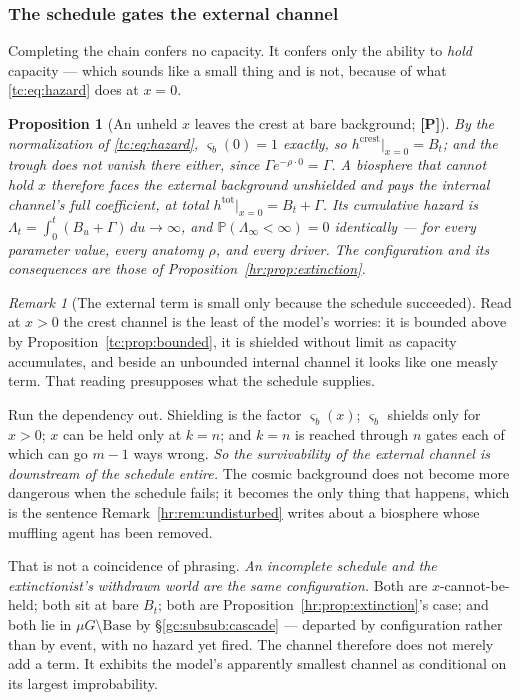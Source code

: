 \documentclass[11pt]{article}
\numberwithin{equation}{section}
\theoremstyle{plain}
\newtheorem{proposition}[theorem]{Proposition}
\theoremstyle{definition}
\theoremstyle{remark}
\newtheorem{remark}[theorem]{Remark}
\newcommand{\PP}{\mathbb{P}}
\begin{document}
\subsubsection{The schedule gates the external channel}
\label{sch:subsub:gating}

Completing the chain confers no capacity. It confers only the ability to
\emph{hold} capacity --- which sounds like a small thing and is not,
because of what \eqref{tc:eq:hazard} does at $x=0$.

\begin{proposition}[An unheld $x$ leaves the crest at bare background;
\textbf{[P]}]\label{sch:prop:gating}
By the normalization of \eqref{tc:eq:hazard}, $\varsigma_b(0)=1$
exactly, so $h^{\mathrm{crest}}\big|_{x=0}=B_t$; and the trough does not
vanish there either, since $\Gamma e^{-\rho\cdot0}=\Gamma$. A biosphere
that cannot hold $x$ therefore faces the external background unshielded
\emph{and} pays the internal channel's full coefficient, at total
$h^{\mathrm{tot}}\big|_{x=0}=B_t+\Gamma$. Its cumulative hazard is
$\Lambda_t=\int_0^t(B_u+\Gamma)\,du\to\infty$, and
$\PP(\Lambda_\infty<\infty)=0$ identically --- for every parameter
value, every anatomy $\rho$, and every driver. The configuration and its
consequences are those of Proposition~\ref{hr:prop:extinction}.
\end{proposition}

\begin{remark}[The external term is small only because the schedule
succeeded]\label{sch:rem:reliance}
Read at $x>0$ the crest channel is the least of the model's worries: it
is bounded above by Proposition~\ref{tc:prop:bounded}, it is shielded
without limit as capacity accumulates, and beside an unbounded internal
channel it looks like one measly term. That reading presupposes what the
schedule supplies.

Run the dependency out. Shielding is the factor $\varsigma_b(x)$;
$\varsigma_b$ shields only for $x>0$; $x$ can be held only at $k=n$; and
$k=n$ is reached through $n$ gates each of which can go $m-1$ ways
wrong. \emph{So the survivability of the external channel is downstream
of the schedule entire.} The cosmic background does not become more
dangerous when the schedule fails; it becomes the only thing that
happens, which is the sentence Remark~\ref{hr:rem:undisturbed} writes
about a biosphere whose muffling agent has been removed.

That is not a coincidence of phrasing. \emph{An incomplete schedule and
the extinctionist's withdrawn world are the same configuration.} Both
are $x$-cannot-be-held; both sit at bare $B_t$; both are
Proposition~\ref{hr:prop:extinction}'s case; and both lie in
$\mu G\setminus\mathrm{Base}$ by \S\ref{gc:subsub:cascade} --- departed
by configuration rather than by event, with no hazard yet fired. The
channel therefore does not merely add a term. It exhibits the model's
apparently smallest channel as conditional on its largest improbability.
\end{remark}
\end{document}
